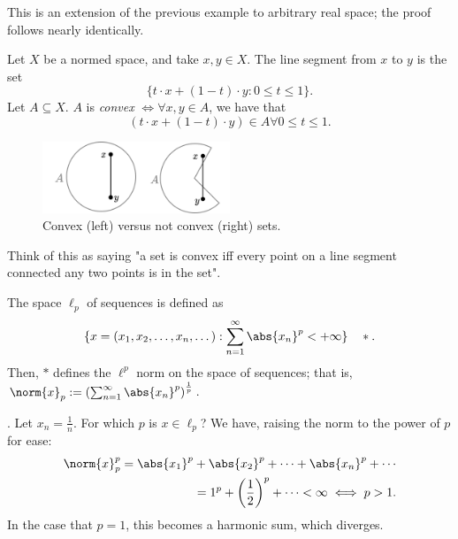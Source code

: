 \begin{remark}
    This is an extension of the previous example to arbitrary real space; the proof follows nearly identically.
\end{remark}

\begin{definition}
    Let $X$ be a normed space, and take $x, y \in X$. The line segment from $x$ to $y$ is the set \[
    \{t \cdot x  + (1 - t)\cdot y: 0 \leq t \leq 1\} .
    \]
    Let $A \subseteq X$. $A$ is \emph{convex} $\iff \forall x,y \in A$, we have that $$(t \cdot x + (1- t)\cdot y) \in A \forall 0 \leq t \leq 1.$$
\end{definition}

\begin{figure}[!ht]
    \centering
    \includegraphics[width=0.5\textwidth]{misc/convex.png}
    \caption{Convex (left) versus not convex (right) sets.}
\end{figure}

\begin{remark}
    Think of this as saying "a set is convex iff every point on a line segment connected any two points is in the set".
\end{remark}

\begin{definition}[$\ell_p$]
    The space $\ell_p$ of sequences is defined as \[
    \{x = (x_1, x_2, \dots, x_n, \dots) : \sum_{n=1}^{\infty} \abs{x_n}^p < + \infty\} \quad \ast.
    \]
    Then, $\ast$ defines the $\ell^p$ norm on the space of sequences; that is, $\norm{x}_p := \left(\sum_{n = 1}^\infty \abs{x_n}^p\right)^{\frac{1}{p}}$.
\end{definition}

\begin{example}[$\ell_p$, $x_n = \frac{1}{n}$].
   Let $x_n = \frac{1}{n}$. For which $p$ is $x \in \ell_p$? We have, raising the norm to the power of $p$ for ease:
   \begin{align*}
    \norm{x}_p^p = \abs{x_1}^p + \abs{x_2}^p + \cdots + \abs{x_n}^p + \cdots\\
    = 1^p + \left(\frac{1}{2}\right)^p + \cdots < \infty \iff p > 1.
   \end{align*}
   In the case that $p = 1$, this becomes a harmonic sum, which diverges.
\end{example}

